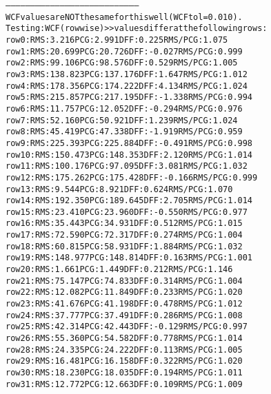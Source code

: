 \begin{alltt}
--------------------------------------------------------------------------------
WCF values are NOT the same for this well (WCF tol = 0.010).
Testing: WCF (rowwise) >> values differ at the following rows:
row   0:  RMS:   3.216    PCG:   2.991    DFF:   0.225    RMS/PCG:   1.075    
row   1:  RMS:  20.699    PCG:  20.726    DFF:  -0.027    RMS/PCG:   0.999    
row   2:  RMS:  99.106    PCG:  98.576    DFF:   0.529    RMS/PCG:   1.005    
row   3:  RMS: 138.823    PCG: 137.176    DFF:   1.647    RMS/PCG:   1.012    
row   4:  RMS: 178.356    PCG: 174.222    DFF:   4.134    RMS/PCG:   1.024    
row   5:  RMS: 215.857    PCG: 217.195    DFF:  -1.338    RMS/PCG:   0.994    
row   6:  RMS:  11.757    PCG:  12.052    DFF:  -0.294    RMS/PCG:   0.976    
row   7:  RMS:  52.160    PCG:  50.921    DFF:   1.239    RMS/PCG:   1.024    
row   8:  RMS:  45.419    PCG:  47.338    DFF:  -1.919    RMS/PCG:   0.959    
row   9:  RMS: 225.393    PCG: 225.884    DFF:  -0.491    RMS/PCG:   0.998    
row  10:  RMS: 150.473    PCG: 148.353    DFF:   2.120    RMS/PCG:   1.014    
row  11:  RMS: 100.176    PCG:  97.095    DFF:   3.081    RMS/PCG:   1.032    
row  12:  RMS: 175.262    PCG: 175.428    DFF:  -0.166    RMS/PCG:   0.999    
row  13:  RMS:   9.544    PCG:   8.921    DFF:   0.624    RMS/PCG:   1.070    
row  14:  RMS: 192.350    PCG: 189.645    DFF:   2.705    RMS/PCG:   1.014    
row  15:  RMS:  23.410    PCG:  23.960    DFF:  -0.550    RMS/PCG:   0.977    
row  16:  RMS:  35.443    PCG:  34.931    DFF:   0.512    RMS/PCG:   1.015    
row  17:  RMS:  72.590    PCG:  72.317    DFF:   0.274    RMS/PCG:   1.004    
row  18:  RMS:  60.815    PCG:  58.931    DFF:   1.884    RMS/PCG:   1.032    
row  19:  RMS: 148.977    PCG: 148.814    DFF:   0.163    RMS/PCG:   1.001    
row  20:  RMS:   1.661    PCG:   1.449    DFF:   0.212    RMS/PCG:   1.146    
row  21:  RMS:  75.147    PCG:  74.833    DFF:   0.314    RMS/PCG:   1.004    
row  22:  RMS:  12.082    PCG:  11.849    DFF:   0.233    RMS/PCG:   1.020    
row  23:  RMS:  41.676    PCG:  41.198    DFF:   0.478    RMS/PCG:   1.012    
row  24:  RMS:  37.777    PCG:  37.491    DFF:   0.286    RMS/PCG:   1.008    
row  25:  RMS:  42.314    PCG:  42.443    DFF:  -0.129    RMS/PCG:   0.997    
row  26:  RMS:  55.360    PCG:  54.582    DFF:   0.778    RMS/PCG:   1.014    
row  28:  RMS:  24.335    PCG:  24.222    DFF:   0.113    RMS/PCG:   1.005    
row  29:  RMS:  16.481    PCG:  16.158    DFF:   0.322    RMS/PCG:   1.020    
row  30:  RMS:  18.230    PCG:  18.035    DFF:   0.194    RMS/PCG:   1.011    
row  31:  RMS:  12.772    PCG:  12.663    DFF:   0.109    RMS/PCG:   1.009    

\end{alltt}
